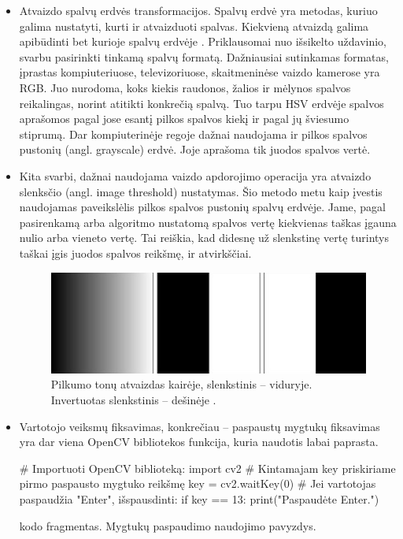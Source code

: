 \documentclass[a4paper,12pt]{article}
\begin{document}
\begin{itemize}
	\item Atvaizdo spalvų erdvės transformacijos. Spalvų erdvė yra metodas, kuriuo galima nustatyti, kurti ir atvaizduoti spalvas. Kiekvieną atvaizdą galima apibūdinti bet kurioje spalvų erdvėje \cite{COLORSPACE}. Priklausomai nuo išsikelto uždavinio, svarbu pasirinkti tinkamą spalvų formatą. Dažniausiai sutinkamas formatas, įprastas kompiuteriuose, televizoriuose, skaitmeninėse vaizdo kamerose yra RGB. Juo nurodoma, koks kiekis raudonos, žalios ir mėlynos spalvos reikalingas, norint atitikti konkrečią spalvą. Tuo tarpu HSV erdvėje spalvos aprašomos pagal jose esantį pilkos spalvos kiekį ir pagal jų šviesumo stiprumą. Dar kompiuterinėje regoje dažnai naudojama ir pilkos spalvos pustonių (angl. grayscale) erdvė. Joje aprašoma tik juodos spalvos vertė. 
	\item  Kita svarbi, dažnai naudojama vaizdo apdorojimo operacija yra atvaizdo slenksčio (angl. image threshold) nustatymas. Šio metodo metu kaip įvestis naudojamas paveikslėlis pilkos spalvos pustonių spalvų erdvėje. Jame, pagal pasirenkamą arba algoritmo nustatomą spalvos vertę kiekvienas taškas įgauna nulio arba vieneto vertę. Tai reiškia, kad didesnę už slenkstinę vertę turintys taškai įgis juodos spalvos reikšmę, ir atvirkščiai.
	\begin{figure}[H]
			\centering
			\includegraphics[scale=0.4]{images/threshold}
			\caption{Pilkumo tonų atvaizdas kairėje, slenkstinis – viduryje. Invertuotas slenkstinis – dešinėje \cite{THRESHOLD}.}   %
			\label{img:threshold}
	\end{figure}
	
	\item Vartotojo veiksmų fiksavimas, konkrečiau – paspaustų mygtukų fiksavimas yra dar viena OpenCV bibliotekos funkcija, kuria naudotis labai paprasta.
	\begin{listing}[H]
		\begin{pythoncode}
# Importuoti OpenCV biblioteką:
import cv2
# Kintamajam key priskiriame pirmo paspausto mygtuko reikšmę
key = cv2.waitKey(0)
# Jei vartotojas paspaudžia "Enter", išspausdinti:
if key == 13:
	print("Paspaudėte Enter.")
		\end{pythoncode}
		\caption{kodo fragmentas. Mygtukų paspaudimo naudojimo pavyzdys.}
		\label{lng:1}		
	\end{listing}
	

\end{itemize}
\end{document}
